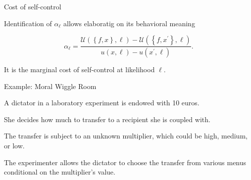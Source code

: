 \documentclass[usenames,dvipsnames,aspectratio=169,11pt, envcountsect]{beamer}
\begin{document}
\appendix

\begin{frame}{Cost of self-control}

	Identification of \( \alpha_{\ell} \) allows elaboratig on its behavioral meaning

	\vfill

	\[
		\alpha_{\ell} = \frac{\mathcal{U} \left( \left\{f, x \right\}, \ell \right) - \mathcal{U} \left( \left\{f, x^{\prime} \right\}, \ell \right) }{u \left( x , \ell \right) - u \left( x^{\prime} , \ell \right)} .
	\]

	\vfill

	It is the marginal cost of self-control at likelihood \( \ell \).

\end{frame}

\begin{frame}{Example: Moral Wiggle Room \citep{danaExploitingMoralWiggle2007}}

	A dictator in a laboratory experiment is endowed with 10 euros.

	\vfill

	She decides how much to transfer to a recipient she is coupled with.

	\vfill

	The transfer is subject to an unknown multiplier, which could be high, medium, or low.

	\vfill

	The experimenter allows the dictator to choose the transfer from various menus conditional on the multiplier's value.

\end{frame}
\end{document}

